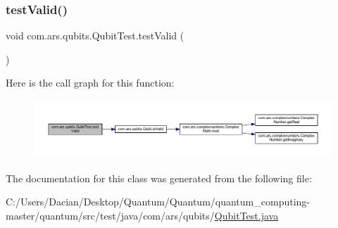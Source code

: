 \subsubsection{\texorpdfstring{test\+Valid()}{testValid()}}
{\footnotesize\ttfamily void com.\+ars.\+qubits.\+Qubit\+Test.\+test\+Valid (\begin{DoxyParamCaption}{ }\end{DoxyParamCaption})}

Here is the call graph for this function\+:\nopagebreak
\begin{figure}[H]
\begin{center}
\leavevmode
\includegraphics[width=350pt]{classcom_1_1ars_1_1qubits_1_1_qubit_test_add210bf06395e140f80609f097df4a2c_cgraph}
\end{center}
\end{figure}


The documentation for this class was generated from the following file\+:\begin{DoxyCompactItemize}
\item 
C\+:/\+Users/\+Dacian/\+Desktop/\+Quantum/\+Quantum/quantum\+\_\+computing-\/master/quantum/src/test/java/com/ars/qubits/\hyperlink{_qubit_test_8java}{Qubit\+Test.\+java}\end{DoxyCompactItemize}
